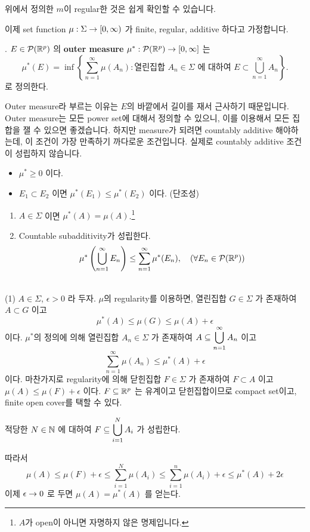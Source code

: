위에서 정의한 \(m\)이 regular한 것은 쉽게 확인할 수 있습니다.

이제 set function \(\mu: \Sigma \rightarrow [0, \infty)\) 가 finite, regular, additive 하다고 가정합니다.

.  \(E \in \mathcal{P}(\mathbb{R}^p)\) 의 \textbf{outer measure} \(\mu^\ast: \mathcal{P}(\mathbb{R}^p) \rightarrow [0, \infty]\) 는
\[
    \mu^\ast(E) = \inf \left\{\sum_{n=1}^\infty \mu(A_n) : \text{열린집합 } A_n \in \Sigma \text{ 에 대하여 } E \subset \bigcup_{n=1}^\infty A_n\right\}.
\]
로 정의한다.

Outer measure라 부르는 이유는 \(E\)의 바깥에서 길이를 재서 근사하기 때문입니다. Outer measure는 모든 power set에 대해서 정의할 수 있으니, 이를 이용해서 모든 집합을 잴 수 있으면 좋겠습니다. 하지만 measure가 되려면 countably additive 해야하는데, 이 조건이 가장 만족하기 까다로운 조건입니다. 실제로 countably additive 조건이 성립하지 않습니다.

\rmk
\begin{itemize}
    \item \(\mu^\ast \geq 0\) 이다.
    \item \(E_1 \subset E_2\) 이면 \(\mu^\ast(E_1) \leq \mu^\ast(E_2)\) 이다. (단조성)
\end{itemize}

\begin{enumerate}
    \item \(A \in \Sigma\) 이면 \(\mu^\ast(A) = \mu(A)\).\footnote{\(A\)가 open이 아니면 자명하지 않은 명제입니다.}
    \item Countable subadditivity가 성립한다.
          \[
              \mu^\ast\left( \bigcup_{n=1}^\infty E_n \right) \leq \sum_{n=1}^\infty \mu^\ast(E_n), \quad (\forall E_n \in \mathcal{P}(\mathbb{R}^p))
          \]
\end{enumerate}

\pf \\
(1) \(A \in \Sigma\), \(\epsilon > 0\) 라 두자. \(\mu\)의 regularity를 이용하면, 열린집합 \(G \in \Sigma\) 가 존재하여 \(A \subset G\) 이고
\[
    \mu^\ast(A) \leq \mu(G) \leq \mu(A) + \epsilon
\]
이다. \(\mu^\ast\)의 정의에 의해 열린집합 \(A_n \in \Sigma\) 가 존재하여 \(A \subseteq \displaystyle \bigcup_{n=1}^\infty A_n\) 이고
\[
    \sum_{n=1}^\infty \mu(A_n) \leq \mu^\ast(A) + \epsilon
\]
이다. 마찬가지로 regularity에 의해 닫힌집합 \(F \in \Sigma\) 가 존재하여 \(F\subset A\) 이고 \(\mu(A) \leq \mu(F) + \epsilon\) 이다. \(F \subseteq \mathbb{R}^p\) 는 유계이고 닫힌집합이므로 compact set이고, finite open cover를 택할 수 있다.
\begin{center}
    적당한 \(N \in \mathbb{N}\) 에 대하여 \(F \subseteq \displaystyle\bigcup_{i=1}^N A_{i}\) 가 성립한다.
\end{center}
따라서
\[
    \mu(A) \leq \mu(F) + \epsilon \leq \sum_{i=1}^N \mu(A_i) \leq \sum_{i=1}^n \mu(A_i) + \epsilon \leq \mu^\ast(A) + 2\epsilon
\]
이제 \(\epsilon \rightarrow 0\) 로 두면 \(\mu(A) = \mu^\ast(A)\) 를 얻는다.

